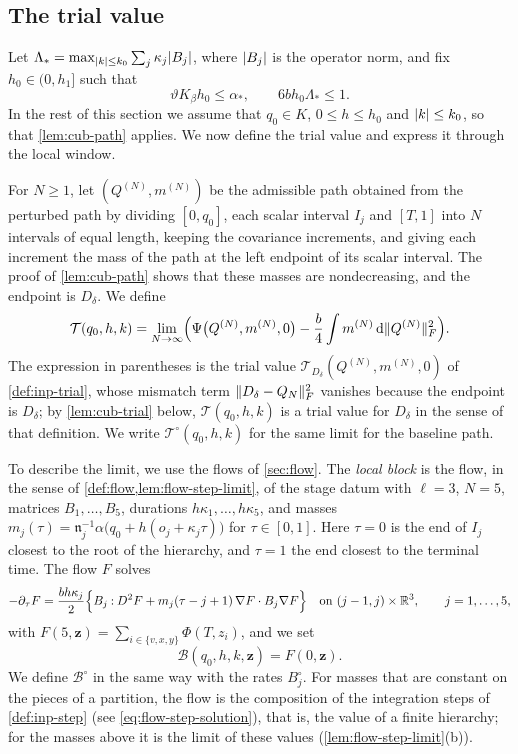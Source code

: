 \subsection{The trial value}\label{sec:cub-trial}

Let $\Lambda_*=\max_{\lvert k\rvert\le k_0}\sum_j\kappa_j\lvert B_j\rvert$, where $\lvert B_j\rvert$
is the operator norm, and fix $h_0\in(0,h_1]$ such that
\begin{equation}\label{eq:cub-h0}
 \vartheta K_\beta h_0\le\alpha_*,\qquad 6bh_0\Lambda_*\le1.
\end{equation}
In the rest of this section we assume that $q_0\in K$, $0\le h\le h_0$ and
$\lvert k\rvert\le k_0$, so that \cref{lem:cub-path} applies. We now define the trial
value and express it through the local window.

For $N\ge1$, let $(Q^{(N)},m^{(N)})$ be the admissible path obtained from the
perturbed path by dividing $[0,q_0]$, each scalar interval $I_j$ and $[T,1]$
into $N$ intervals of equal length, keeping the covariance increments, and
giving each increment the mass of the path at the left endpoint of its scalar
interval. The proof of \cref{lem:cub-path} shows that these masses are
nondecreasing, and the endpoint is $D_\delta$. We define
\begin{equation}\label{b:eq:os-trial}
 \mathcal T(q_0,h,k)=\lim_{N\to\infty}\Bigl(\Psi\bigl(Q^{(N)},m^{(N)},0\bigr)
 -\frac b4\int m^{(N)}\,\mathrm d\lVert Q^{(N)}\rVert_F^2\Bigr).
\end{equation}
The expression in parentheses is the trial value
$\mathcal T_{D_\delta}(Q^{(N)},m^{(N)},0)$ of \cref{def:inp-trial}, whose
mismatch term $\lVert D_\delta-Q_N\rVert_F^2$ vanishes because the endpoint is
$D_\delta$; by \cref{lem:cub-trial} below,
$\mathcal T(q_0,h,k)$ is a trial value for $D_\delta$ in the sense of that
definition. We write $\mathcal T^\circ(q_0,h,k)$ for the same limit for the
baseline path.

To describe the limit, we use the flows of \cref{sec:flow}. The \emph{local
block} is the flow, in the sense of \cref{def:flow,lem:flow-step-limit}, of the
stage datum with $\ell=3$, $N=5$, matrices $B_1,\dots,B_5$, durations
$h\kappa_1,\dots,h\kappa_5$, and masses
$m_j(\tau)=\mathfrak n_j^{-1}\alpha\bigl(q_0+h(o_j+\kappa_j\tau)\bigr)$ for
$\tau\in[0,1]$. Here $\tau=0$ is the end of $I_j$ closest to the root of
the hierarchy, and $\tau=1$ the end closest to the terminal time. The flow
$F$ solves
\begin{equation}\label{b:eq:os-vector-flow}
 -\partial_\tau F=\frac{bh\kappa_j}2\Bigl\{B_j\mathbin:D^2F
 +m_j(\tau-j+1)\,\nabla F\cdot B_j\nabla F\Bigr\}\quad\text{on }(j-1,j)\times\mathbb R^3,
 \qquad j=1,\dots,5,
\end{equation}
with $F(5,\mathbf z)=\sum_{i\in\{v,x,y\}}\Phi(T,z_i)$, and we set
\[
 \mathcal B(q_0,h,k,\mathbf z)=F(0,\mathbf z).
\]
We define $\mathcal B^\circ$ in the same way with the rates $B_j^\circ$. For
masses that are constant on the pieces of a partition, the flow is the
composition of the integration steps of \cref{def:inp-step}
(see \eqref{eq:flow-step-solution}), that is, the value of a finite hierarchy; for
the masses above it is the limit of these values (\cref{lem:flow-step-limit}(b)).

